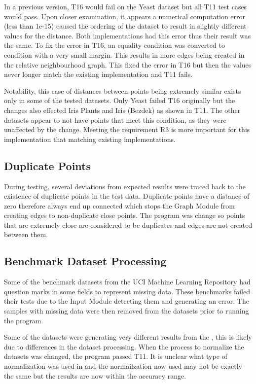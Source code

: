 \documentclass[12pt, titlepage]{article}
\begin{document}
In a previous version, T16 would fail on the Yeast dataset but all T11 test cases would pass. Upon closer examination, it appears a numerical computation error (less than 1e-15) caused the ordering of the dataset to result in slightly different values for the distance. Both implementations had this error thus their result was the same. To fix the error in T16, an equality condition was converted to condition with a very small margin. This results in more edges being created in the relative neighbourhood graph. This fixed the error in T16 but then the values never longer match the existing implementation and T11 fails.

Notability, this case of distances between points being extremely similar exists only in some of the tested datasets. 
Only Yeast failed T16 originally but the changes also effected Iris Plants and Iris (Bezdek) as shown in T11.
The other datasets appear to not have points that meet this condition, as they were unaffected by the change.
Meeting the requirement R3 is more important for this implementation that matching existing implementations.

\subsection{Duplicate Points}
During testing, several deviations from expected results were traced back to the existence of duplicate points in the test data. Duplicate points have a distance of zero therefore always end up connected which stops the Graph Module from creating edges to non-duplicate close points. The program was change so points that are extremely close are considered to be duplicates and edges are not created between them.

\subsection{Benchmark Dataset Processing}
Some of the benchmark datasets from the UCI Machine Learning Repository had question marks in some fields to represent missing data.
These benchmarks failed their tests due to the Input Module detecting them and generating an error.
The samples with missing data were then removed from the datasets prior to running the program.

Some of the datasets were generating very different results from the \cite{zighed_statistical_2005}, this is likely due to differences in the dataset processing.
When the process to normalize the datasets was changed, the program passed T11.
It is unclear what type of normalization was used in \cite{zighed_statistical_2005} and the normailzation now used may not be exactly the same but the results are now within the accuracy range.
\end{document}
